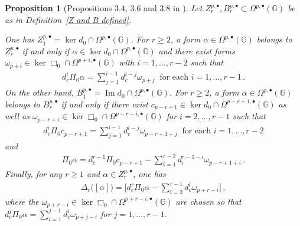 \documentclass[dvipsnames]{amsart}
\newtheorem{proposition}[theorem]{Proposition}
\theoremstyle{definition}
\theoremstyle{definition}
\numberwithin{equation}{section}
\newcommand{\G}{\mathbb{G}}
\begin{document}
\begin{proposition}[Propositions 3.4, 3.6 and 3.8 in \cite{tripaldi2026spectralcomplexestruncatedmulticomplexes}]\label{prop: spectral things in terms of Rumin}
    Let $Z_r^{p,\bullet}, B_r^{p,\bullet} \subset \Omega^{p,\bullet}(\mathbb{G})$ be as in Definition~\ref{Z and B defined}.
    
    One has $Z_1^{p,\bullet}=\ker d_0\cap\Omega^{p,\bullet}(\G)$. For $r\ge 2$, a form $\alpha\in\Omega^{p,\bullet}(\G)$ belongs to $Z_r^{p,\bullet}$ if and only if $\alpha\in\ker d_0\cap\Omega^{p,\bullet}(\G)$ and there exist forms ${\omega}_{p+i}\in\ker\Box_0\cap\Omega^{p+i,\bullet}(\G)$ with $i=1,\ldots,r-2$ such that
    \begin{align*}
        d_c^i\Pi_0\alpha=\sum_{j=1}^{i-1}d_c^{i-j}\omega_{p+j}\ \text{ for each }i=1,\ldots,r-1\,.
    \end{align*}
    On the other hand, $B_1^{p,\bullet}=\operatorname{Im}d_0\cap\Omega^{p,\bullet}(\G)$. For $r\ge 2$, a form $\alpha\in\Omega^{p,\bullet}(\G)$ belongs to $B_r^{p,\bullet}$ if and only if there exist $c_{p-r+1}\in\ker d_0\cap\Omega^{p-r+1,\bullet}(\G)$ as well as $\omega_{p-r+i}\in\ker\Box_0\cap\Omega^{p-r+i,\bullet}(\G)$ for $i=2,\ldots,r-1$ such that
    \begin{align*}
        d_c^i\Pi_0 c_{p-r+1}=\sum_{j=1}^{i-1}d_c^{i-j}\omega_{p-r+1+j}\ \text{ for each }i=1,\ldots,r-2
    \end{align*}
    and
    \begin{align*}
        \Pi_0\alpha=d_c^{r-1}\Pi_0c_{p-r+1}-\sum_{i=1}^{r-2}d_c^{r-1-i}\omega_{p-r+1+i}\,.
    \end{align*}
    Finally, for any $r\ge 1$ and $\alpha\in Z_r^{p,\bullet}$, one has
    \begin{align*}
        \Delta_r\big([\alpha]\big)=\bigg[d_c^r\Pi_0\alpha-\sum_{i=2}^{r-1}d_c^i\omega_{p+r-i}\bigg]\,,
    \end{align*}
    where the $\omega_{p+r-i}\in\ker\Box_0\cap\Omega^{p+r-i,\bullet}(\G)$ are chosen so that $d_c^j\Pi_0\alpha=\sum_{i=1}^{j-1}d_c^i\omega_{p+j-i}$ for $j=1,\ldots,r-1$.
\end{proposition}
\end{document}
